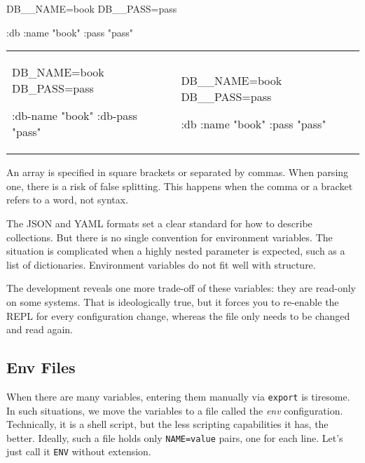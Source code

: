 \splitter

\begin{clojure}
DB__NAME=book
DB__PASS=pass

{:db {:name "book"
      :pass "pass"}}
\end{clojure}

\else


\noindent
\begin{tabular}{ @{}p{5cm} @{}p{5cm} }

\begin{clojure}
DB_NAME=book
DB_PASS=pass

{:db-name "book"
 :db-pass "pass"}
\end{clojure}

&

\begin{clojure}
DB__NAME=book
DB__PASS=pass

{:db {:name "book"
      :pass "pass"}}
\end{clojure}

\end{tabular}


\fi


An array is specified in square brackets or separated by commas. When parsing one, there is a risk of false splitting. This happens when the comma or a bracket refers to a word, not syntax.


The JSON and YAML formats set a clear standard for how to describe collections. But there is no single convention for environment variables. The situation is complicated when a highly nested parameter is expected, such as a list of dictionaries. Environment variables do not fit well with structure.

The development reveals one more trade-off of these variables: they are read-only on some systems. That is ideologically true, but it forces you to re-enable the REPL for every configuration change, whereas the file only needs to be changed and read again.

\subsection{Env Files}


When there are many variables, entering them manually via \verb|export| is tiresome. In such situations, we move the variables to a file called the \emph{env} configuration. Technically, it is a shell script, but the less scripting capabilities it has, the better. Ideally, such a file holds only \verb|NAME=value| pairs, one for each line. Let's just call it \verb|ENV| without extension.

